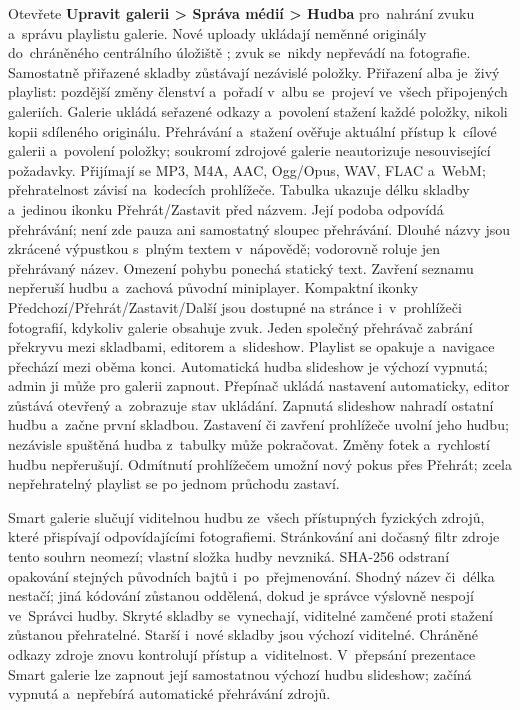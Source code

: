 \documentclass[11pt,a4paper]{article}
\newcommand{\filepath}[1]{\path{#1}}
\newcommand{\ui}[1]{\textbf{#1}}
\begin{document}
Otevřete \ui{Upravit galerii > Správa médií > Hudba} pro~nahrání zvuku a~správu
playlistu galerie. Nové uploady ukládají neměnné originály do~chráněného
centrálního úložiště \filepath{data/music/}; zvuk se~nikdy nepřevádí na
fotografie.
Samostatně přiřazené skladby zůstávají nezávislé položky. Přiřazení alba je~živý
playlist: pozdější změny členství a~pořadí v~albu se~projeví ve~všech
připojených
galeriích. Galerie ukládá seřazené odkazy a~povolení stažení každé položky,
nikoli kopii sdíleného originálu. Přehrávání a~stažení ověřuje aktuální přístup
k~cílové galerii a~povolení položky; soukromí zdrojové galerie neautorizuje
nesouvisející požadavky. Přijímají se MP3, M4A, AAC, Ogg/Opus, WAV, FLAC a~WebM;
přehratelnost závisí na~kodecích prohlížeče.
Tabulka ukazuje délku skladby a~jedinou ikonku Přehrát/Zastavit před
názvem. Její podoba odpovídá přehrávání; není zde pauza ani samostatný
sloupec přehrávání. Dlouhé názvy jsou zkrácené výpustkou s~plným textem
v~nápovědě; vodorovně roluje jen přehrávaný název. Omezení pohybu ponechá
statický text. Zavření seznamu nepřeruší hudbu a~zachová původní miniplayer.
Kompaktní
ikonky Předchozí/Přehrát/Zastavit/Další jsou dostupné na stránce i~v~prohlížeči
fotografií, kdykoliv galerie obsahuje zvuk. Jeden společný přehrávač zabrání
překryvu mezi skladbami, editorem a~slideshow. Playlist se opakuje a~navigace
přechází mezi oběma konci. Automatická hudba slideshow je výchozí vypnutá;
admin ji může pro galerii zapnout. Přepínač ukládá nastavení automaticky,
editor zůstává otevřený a~zobrazuje stav ukládání. Zapnutá slideshow nahradí
ostatní hudbu
a~začne první skladbou. Zastavení či zavření prohlížeče uvolní jeho hudbu;
nezávisle spuštěná hudba z~tabulky může pokračovat. Změny fotek a~rychlostí
hudbu nepřerušují. Odmítnutí prohlížečem umožní nový pokus přes Přehrát; zcela
nepřehratelný playlist se po jednom průchodu zastaví.

Smart galerie slučují viditelnou hudbu ze~všech přístupných fyzických
zdrojů, které přispívají odpovídajícími fotografiemi. Stránkování ani dočasný
filtr zdroje tento souhrn neomezí; vlastní složka hudby nevzniká. SHA-256
odstraní opakování stejných původních bajtů i~po~přejmenování. Shodný název
či~délka nestačí; jiná kódování zůstanou oddělená, dokud je správce výslovně
nespojí ve~Správci hudby. Skryté skladby se~vynechají, viditelné zamčené proti
stažení
zůstanou přehratelné. Starší i~nové skladby jsou výchozí viditelné. Chráněné
odkazy zdroje znovu kontrolují přístup a~viditelnost. V~přepsání prezentace
Smart galerie lze zapnout její samostatnou výchozí hudbu slideshow; začíná
vypnutá a~nepřebírá automatické přehrávání zdrojů.
\end{document}
